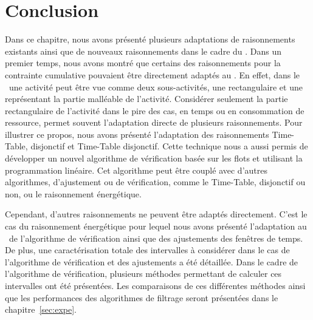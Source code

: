 \section*{Conclusion}

Dans ce chapitre, nous avons présenté plusieurs adaptations de
raisonnements existants ainsi que de nouveaux raisonnements dans le
cadre du \CECSP. Dans un premier temps, nous avons montré que certains
des raisonnements pour la contrainte cumulative pouvaient être
directement adaptés au \CECSP. En effet, dans le \CECSP~une activité
peut être vue comme deux sous-activités, une rectangulaire et une
représentant la partie malléable de l'activité. Considérer seulement
la partie rectangulaire de l'activité dans le pire des cas, en temps
ou en consommation de ressource, permet souvent l'adaptation directe
de plusieurs raisonnements. Pour illustrer ce propos, nous avons
présenté l'adaptation des raisonnements Time-Table, disjonctif et
Time-Table disjonctif. Cette technique nous a aussi permis de
développer un nouvel algorithme de vérification basée sur les flots et
utilisant la programmation linéaire. Cet algorithme peut être couplé
avec d'autres algorithmes, d'ajustement ou de vérification, comme le
Time-Table, disjonctif ou non, ou le raisonnement énergétique.

Cependant, d'autres raisonnements ne peuvent être adaptés
directement. C'est le cas du raisonnement énergétique pour lequel nous
avons présenté l'adaptation au \CECSP~de l'algorithme de vérification
ainsi que des ajustements des fenêtres de temps. De plus, une
caractérisation totale des intervalles à considérer dans le cas de
l'algorithme de vérification et des ajustements a été détaillée. Dans
le cadre de l'algorithme de vérification, plusieurs méthodes
permettant de calculer ces intervalles ont été présentées. Les
comparaisons de ces différentes méthodes ainsi que les performances
des algorithmes de filtrage seront présentées dans le
chapitre~\ref{sec:expe}. 
